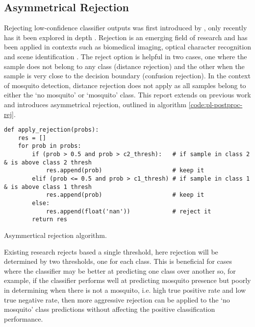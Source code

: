     \subsection{Asymmetrical Rejection}
    \label{subsec:pl-postproc-rej}
        Rejecting low-confidence classifier outputs was first introduced by \textcite{Chow1970}, only recently has it been explored in depth \cite{SajjadAhmedNadeem,Condessa2017}. Rejection is an emerging field of research and has been applied in contexts such as biomedical imaging, optical character recognition and scene identification \cite{Condessa2017}. The reject option is helpful in two cases, one where the sample does not belong to any class (distance rejection) and the other when the sample is very close to the decision boundary (confusion rejection). In the context of mosquito detection, distance rejection does not apply as all samples belong to either the `no mosquito' or `mosquito' class. This report extends on previous work and introduces asymmetrical rejection, outlined in algorithm \ref{code:pl-postproc-rej}.
        \begin{listing}[ht]
            \begin{verbatim}
def apply_rejection(probs):
    res = []
    for prob in probs:
        if (prob > 0.5 and prob > c2_thresh):   # if sample in class 2 & is above class 2 thresh
            res.append(prob)                    # keep it
        elif (prob <= 0.5 and prob > c1_thresh) # if sample in class 1 & is above class 1 thresh
            res.append(prob)                    # keep it
        else:
            res.append(float('nan'))            # reject it
        return res
            \end{verbatim}
            \caption{Asymmertical rejection algorithm.}
            \label{code:pl-postproc-rej}
        \end{listing} 
        Existing research rejects based a single threshold, here rejection will be determined by two thresholds, one for each class. This is beneficial for cases where the classifier may be better at predicting one class over another so, for example, if the classifier performs well at predicting mosquito presence but poorly in determining when there is not a mosquito, i.e. high true positive rate and low true negative rate, then more aggressive rejection can be applied to the `no mosquito' class predictions without affecting the positive classification performance.
        
